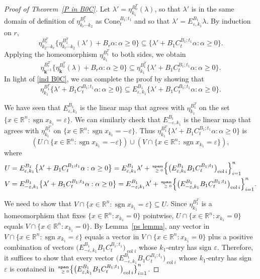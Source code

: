 \documentclass{amsart}
\theoremstyle{definition}
\theoremstyle{remark}
\numberwithin{equation}{section}
\newcommand{\reals}{\mathbb R}
\newcommand{\ep}{\varepsilon}
\newcommand{\col}{\operatorname{col}}
\newcommand{\sgn}{\operatorname{sgn}}
\newcommand{\nnspan}{{\!\!\tiny\begin{array}{r}\mathbf{span}\\\ge0\end{array}\hspace*{-0.57em}}}
\newcommand{\set}[1]{{\lbrace #1 \rbrace}}
\newcommand{\sett}[1]{{\bigl\lbrace #1 \bigr\rbrace}}
\newcommand{\settt}[1]{{\Bigl\lbrace #1 \Bigr\rbrace}}
\newcommand{\0}{{\mathbf{0}}}
\newcommand{\Cone}{\mathrm{Cone}}
\newcommand{\kk}{{\boldsymbol{k}}}
\begin{document}
\begin{proof}[Proof of Theorem~\ref{P in B0C}]
Let $\lambda'=\eta_{k_1}^{B_0^T}(\lambda)$, so that $\lambda'$ is in the same domain of definition of $\eta_{k_r\cdots k_2}^{B_1^T}$ as $\Cone_t^{B_1;t_1}$ and so that $\lambda'=E^{B_1}_{\ep,k_1}\lambda$.
By induction on $r$, 
\[\eta_{k_2\cdots k_r}^{B_r^T}\set{\eta_{k_r\cdots k_2}^{B_1^T}(\lambda')+B_r\alpha:\alpha\ge0}\subseteq\set{\lambda'+B_1C_t^{B_1;t_1}\alpha:\alpha\ge0}.\]
Applying the homeomorphism $\eta_{k_1}^{B_1^T}$ to both sides, we obtain
\[\eta_{\kk^{-1}}^{B_r^T}\set{\eta_\kk^{B_0^T}(\lambda)+B_r\alpha:\alpha\ge0}\subseteq\eta_{k_1}^{B_1^T}\set{\lambda'+B_1C_t^{B_1;t_1}\alpha:\alpha\ge0}.\]
In light of \eqref{ind B0C}, we can complete the proof by showing that
\[\eta_{k_1}^{B_1^T}\sett{\lambda'+B_1C_t^{B_1;t_1}\alpha:\alpha\ge0}\subseteq E^{B_1}_{\ep,k_1}\sett{\lambda'+B_1C_t^{B_1;t_1}\alpha:\alpha\ge0}.\]

We have seen that $E^{B_1}_{\ep,k_1}$ is the linear map that agrees with $\eta_{k_1}^{B_1^T}$ on the set $\set{x\in\reals^n:\sgn x_{k_1}=\ep}$.
We can similarly check that $E^{B_1}_{-\ep,k_1}$ is the linear map that agrees with $\eta_{k_1}^{B_1^T}$ on $\set{x\in\reals^n:\sgn x_{k_1}=-\ep}$.
Thus $\eta_{k_1}^{B_1^T}\set{\lambda'+B_1C_t^{B_1;t_1}\alpha:\alpha\ge0}$ is
\[(U\cap\set{x\in\reals^n:\sgn x_{k_1}=-\ep})\cup(V\cap\set{x\in\reals^n:\sgn x_{k_1}=\ep}),\]
where %
{\small
\begin{align*}
U&=E^{B_1}_{\ep,k_1}\sett{\lambda'+B_1C_t^{B_1;t_1}\alpha:\alpha\ge0}=E^{B_1}_{\ep,k_1}\lambda'+\nnspan\settt{\bigl(E^{B_1}_{\ep,k_1}B_1C_t^{B_1;t_1}\bigr)_{\col i}}_{i=1}^n\\
V&=E^{B_1}_{-\ep,k_1}\sett{\lambda'+B_1C_t^{B_1;t_1}\alpha:\alpha\ge0}=E^{B_1}_{-\ep,k_1}\lambda'+\nnspan\settt{\bigl(E^{B_1}_{-\ep,k_1}B_1C_t^{B_1;t_1}\bigr)_{\col i}}_{i=1}^n.
\end{align*}
}

We need to show that $V\cap\set{x\in\reals^n:\sgn x_{k_1}=\ep}\subseteq U$.
Since $\eta_{k_1}^{B_1^T}$ is a homeomorphism that fixes $\set{x\in\reals^n:x_{k_1}=0}$ pointwise, $U\cap\set{x\in\reals^n:x_{k_1}=0}$ equals $V\cap\set{x\in\reals^n:x_{k_1}=0}$.
By Lemma~\ref{ps lemma}, any vector in $V\cap\set{x\in\reals^n:\sgn x_{k_1}=\ep}$ equals a vector in $V\cap\set{x\in\reals^n:x_{k_1}=0}$ plus a positive combination of vectors $\bigl(E^{B_1}_{-\ep,k_1}B_1C_t^{B_1;t_1}\bigr)_{\col i}$ whose $k_1$-entry has sign $\ep$.
Therefore, it suffices to show that every vector $\bigl(E^{B_1}_{-\ep,k_1}B_1C_t^{B_1;t_1}\bigr)_{\col i}$ whose $k_1$-entry has sign~$\ep$ is contained in $\nnspan\sett{\bigl(E^{B_1}_{\ep,k_1}B_1C_t^{B_1;t_1}\bigr)_{\col i}}_{i=1}^n$.


\end{proof}
\end{document}
